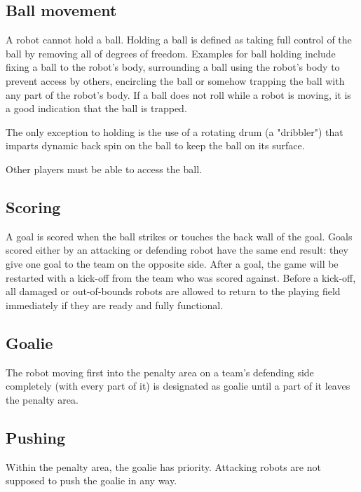 \documentclass{article}
\begin{document}
\subsection{Ball movement \label{ref-ball-movement}}

A robot cannot hold a ball. Holding a ball is defined as taking full control
of the ball by removing all of degrees of freedom. Examples for ball holding
include fixing a ball to the robot's body, surrounding a ball using the robot's
body to prevent access by others, encircling the ball or somehow trapping the
ball with any part of the robot's body. If a ball does not roll while a robot is
moving, it is a good indication that the ball is trapped.

The only exception to holding is the use of a rotating drum (a "dribbler") that
imparts dynamic back spin on the ball to keep the ball on its surface.

Other players must be able to access the ball.

\subsection{Scoring \label{ref-007}}

A goal is scored when the ball strikes or touches the back wall of the goal.
Goals scored either by an attacking or defending robot have the same end
result: they give one goal to the team on the opposite side. After a goal, the
game will be restarted with a kick-off from the team who was scored against.
Before a kick-off, all damaged or out-of-bounds robots are allowed to return to
the playing field immediately if they are ready and fully functional.

\subsection{Goalie \label{ref-008}}

The robot moving first into the penalty area on a team's defending side
completely (with every part of it) is designated as goalie until a part of it
leaves the penalty area.

\subsection{Pushing \label{ref-pushing}}

Within the penalty area, the goalie has priority. Attacking robots are not
supposed to push the goalie in any way.
\end{document}
